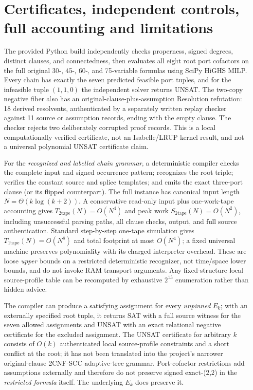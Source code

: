 \documentclass[11pt]{article}
\begin{document}
\section{Certificates, independent controls, full accounting and limitations}
The provided Python build independently checks properness, signed degrees, distinct clauses, and connectedness, then evaluates all eight root port cofactors on the full original 30-, 45-, 60-, and 75-variable formulas using SciPy HiGHS MILP. Every chain has exactly the seven predicted feasible port tuples, and for the infeasible tuple $(1,1,0)$ the independent solver returns UNSAT. The two-copy negative fiber also has an original-clause-plus-assumption Resolution refutation: 18 derived resolvents, authenticated by a separately written replay checker against 11 source or assumption records, ending with the empty clause. The checker rejects two deliberately corrupted proof records. This is a local computationally verified certificate, not an Isabelle/LRUP kernel result, and not a universal polynomial UNSAT certificate claim.

For the \emph{recognized and labelled chain grammar}, a deterministic compiler checks the complete input and signed occurrence pattern; recognizes the root triple; verifies the constant source and splice templates; and emits the exact three-port clause (or its flipped counterpart). The full instance has canonical input length $N=\Theta(k\log(k+2))$. A conservative read-only input plus one-work-tape accounting gives $T_{2\mathrm{tape}}(N)=O(N^4)$ and peak work $S_{2\mathrm{tape}}(N)=O(N^2)$, including unsuccessful parsing paths, all clause checks, output, and full source authentication. Standard step-by-step one-tape simulation gives $T_{1\mathrm{tape}}(N)=O(N^8)$ and total footprint at most $O(N^4)$; a fixed universal machine preserves polynomiality with its charged interpreter overhead. These are loose \emph{upper} bounds on a restricted deterministic recognizer, not time/space lower bounds, and do not invoke RAM transport arguments. Any fixed-structure local source-profile table can be recomputed by exhaustive $2^{15}$ enumeration rather than hidden advice.

The compiler can produce a satisfying assignment for every \emph{unpinned} $E_k$; with an externally specified root tuple, it returns SAT with a full source witness for the seven allowed assignments and UNSAT with an exact relational negative certificate for the excluded assignment. The UNSAT certificate for arbitrary $k$ consists of $O(k)$ authenticated local source-profile constraints and a short conflict at the root; it has not been translated into the project's narrower original-clause 2CNF-SCC adaptive-tree grammar. Port-cofactor restrictions add assumptions externally and therefore do not preserve signed exact-(2,2) in the \emph{restricted formula} itself. The underlying $E_k$ does preserve it.
\end{document}
